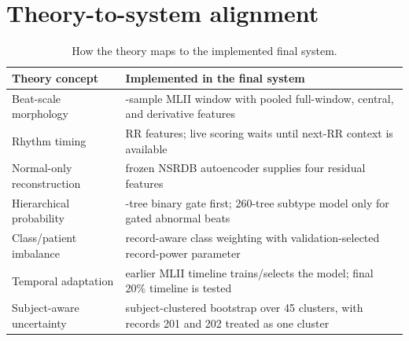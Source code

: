 \section{Theory-to-system alignment}

\begin{table}[H]
\centering
\caption{How the theory maps to the implemented final system.}
\label{tab:theory-system-alignment}
\begin{tabular}{>{\raggedright\arraybackslash}p{4.2cm}>{\raggedright\arraybackslash}p{9.0cm}}
\toprule
Theory concept & Implemented in the final system\\
\midrule
Beat-scale morphology & 512-sample MLII window with pooled full-window,
central, and derivative features\\
Rhythm timing & 15 RR features; live scoring waits until next-RR context is
available\\
Normal-only reconstruction & frozen NSRDB autoencoder supplies four residual
features\\
Hierarchical probability & 240-tree binary gate first; 260-tree subtype model
only for gated abnormal beats\\
Class/patient imbalance & record-aware class weighting with validation-selected
record-power parameter\\
Temporal adaptation & earlier MLII timeline trains/selects the model; final
20\% timeline is tested\\
Subject-aware uncertainty & subject-clustered bootstrap over 45 clusters, with
records 201 and 202 treated as one cluster\\
\bottomrule
\end{tabular}
\end{table}
